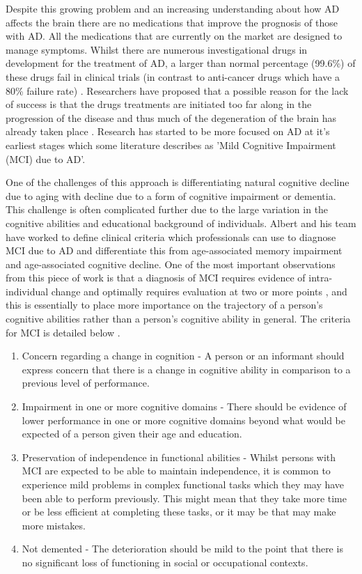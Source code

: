 \par
Despite this growing problem and an increasing understanding about how AD affects the brain there are no medications that improve the prognosis of those with AD. All the medications that are currently on the market are designed to manage symptoms. Whilst there are numerous investigational drugs in development for the treatment of AD, a larger than normal percentage (99.6\%) of these drugs fail in clinical trials (in contrast to anti-cancer drugs which have a 80\% failure rate) \cite{Cummings2014}. Researchers have proposed that a possible reason for the lack of success is that the drugs treatments are initiated too far along in the progression of the disease and thus much of the degeneration of the brain has already taken place \cite{Cummings2014}. Research has started to be more focused on AD at it's earliest stages which some literature describes as 'Mild Cognitive Impairment (MCI) due to AD'.
\par
One of the challenges of this approach is differentiating natural cognitive decline due to aging with decline due to a form of cognitive impairment or dementia. This challenge is often complicated further due to the large variation in the cognitive abilities and educational background of individuals. Albert and his team have worked to define clinical criteria which professionals can use to diagnose MCI due to AD and differentiate this from age-associated memory impairment and age-associated cognitive decline.  One of the most important observations from this piece of work is that a diagnosis of MCI requires evidence of intra-individual change and optimally requires evaluation at two or more points \cite{Albert2011}, and this is essentially to place more importance on the trajectory of a person's cognitive abilities rather than a person's cognitive ability in general. The criteria for MCI is detailed below \cite{Albert2011}.
\begin{enumerate}
	\item Concern regarding a change in cognition - A person or an informant should express concern that there is a change in cognitive ability in comparison to a previous level of performance.
	\item Impairment in one or more cognitive domains - There should be evidence of lower performance in one or more cognitive domains beyond what would be expected of a person given their age and education. 
	\item Preservation of independence in functional abilities - Whilst persons with MCI are expected to be able to maintain independence, it is common to experience mild problems in complex functional tasks which they may have been able to perform previously. This might mean that they take more time or be less efficient at completing these tasks, or it may be that may make more mistakes.
	\item Not demented - The deterioration should be mild to the point that there is no significant loss of functioning in social or occupational contexts.
\end{enumerate}
